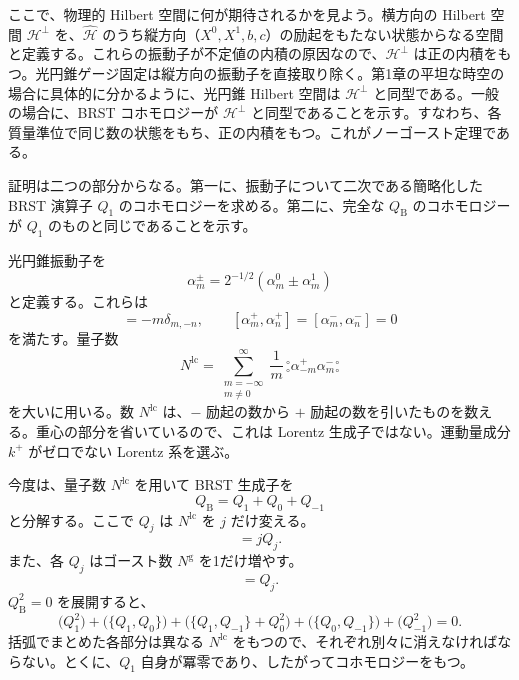 ここで、物理的 Hilbert 空間に何が期待されるかを見よう。横方向の Hilbert 空間 $\mathcal H^\perp$ を、$\widehat{\mathcal H}$ のうち縦方向（$X^0,X^1,b,c$）の励起をもたない状態からなる空間と定義する。これらの振動子が不定値の内積の原因なので、$\mathcal H^\perp$ は正の内積をもつ。光円錐ゲージ固定は縦方向の振動子を直接取り除く。第1章の平坦な時空の場合に具体的に分かるように、光円錐 Hilbert 空間は $\mathcal H^\perp$ と同型である。一般の場合に、BRST コホモロジーが $\mathcal H^\perp$ と同型であることを示す。すなわち、各質量準位で同じ数の状態をもち、正の内積をもつ。これがノーゴースト定理である。


証明は二つの部分からなる。第一に、振動子について二次である簡略化した BRST 演算子 $Q_1$ のコホモロジーを求める。第二に、完全な $Q_{\mathrm B}$ のコホモロジーが $Q_1$ のものと同じであることを示す。

光円錐振動子を
\begin{equation}
\alpha^\pm_m=2^{-1/2}(\alpha^0_m\pm\alpha^1_m)
\tag{4.4.6}\label{eq:4.4.6}
\end{equation}
と定義する。これらは
\begin{equation}
[\alpha^+_m,\alpha^-_n]=-m\delta_{m,-n},
\qquad
[\alpha^+_m,\alpha^+_n]=[\alpha^-_m,\alpha^-_n]=0
\tag{4.4.7}\label{eq:4.4.7}
\end{equation}
を満たす。量子数
\begin{equation}
N^{\mathrm{lc}}=\sum_{\substack{m=-\infty\\m\neq0}}^{\infty}
\frac1m\,{}^\circ_\circ\alpha^+_{-m}\alpha^-_m{}^\circ_\circ
\tag{4.4.8}\label{eq:4.4.8}
\end{equation}
を大いに用いる。数 $N^{\mathrm{lc}}$ は、$-$ 励起の数から $+$ 励起の数を引いたものを数える。重心の部分を省いているので、これは Lorentz 生成子ではない。運動量成分 $k^+$ がゼロでない Lorentz 系を選ぶ。

今度は、量子数 $N^{\mathrm{lc}}$ を用いて BRST 生成子を
\begin{equation}
Q_{\mathrm B}=Q_1+Q_0+Q_{-1}
\tag{4.4.9}\label{eq:4.4.9}
\end{equation}
と分解する。ここで $Q_j$ は $N^{\mathrm{lc}}$ を $j$ だけ変える。
\begin{equation}
[N^{\mathrm{lc}},Q_j]=jQ_j.
\tag{4.4.10}\label{eq:4.4.10}
\end{equation}
また、各 $Q_j$ はゴースト数 $N^{\mathrm g}$ を1だけ増やす。
\begin{equation}
[N^{\mathrm g},Q_j]=Q_j.
\tag{4.4.11}\label{eq:4.4.11}
\end{equation}
$Q_{\mathrm B}^2=0$ を展開すると、
\begin{equation}
\bigl(Q_1^2\bigr)+\bigl(\{Q_1,Q_0\}\bigr)
+\bigl(\{Q_1,Q_{-1}\}+Q_0^2\bigr)
+\bigl(\{Q_0,Q_{-1}\}\bigr)+\bigl(Q_{-1}^2\bigr)=0.
\tag{4.4.12}\label{eq:4.4.12}
\end{equation}
括弧でまとめた各部分は異なる $N^{\mathrm{lc}}$ をもつので、それぞれ別々に消えなければならない。とくに、$Q_1$ 自身が冪零であり、したがってコホモロジーをもつ。

